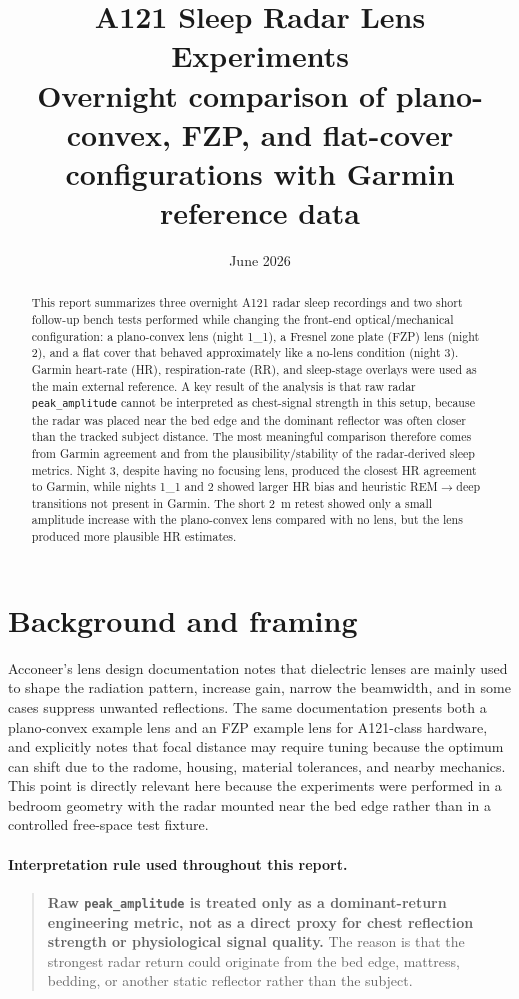 \documentclass[11pt,a4paper]{article}
\title{A121 Sleep Radar Lens Experiments\\\large Overnight comparison of plano-convex, FZP, and flat-cover configurations with Garmin reference data}
\author{}
\date{June 2026}
\begin{document}
\maketitle

\begin{abstract}
This report summarizes three overnight A121 radar sleep recordings and two short follow-up bench tests performed while changing the front-end optical/mechanical configuration: a plano-convex lens (night 1\_1), a Fresnel zone plate (FZP) lens (night 2), and a flat cover that behaved approximately like a no-lens condition (night 3). Garmin heart-rate (HR), respiration-rate (RR), and sleep-stage overlays were used as the main external reference. A key result of the analysis is that raw radar \texttt{peak\_amplitude} cannot be interpreted as chest-signal strength in this setup, because the radar was placed near the bed edge and the dominant reflector was often closer than the tracked subject distance. The most meaningful comparison therefore comes from Garmin agreement and from the plausibility/stability of the radar-derived sleep metrics. Night 3, despite having no focusing lens, produced the closest HR agreement to Garmin, while nights 1\_1 and 2 showed larger HR bias and heuristic REM$\rightarrow$deep transitions not present in Garmin. The short \SI{2}{m} retest showed only a small amplitude increase with the plano-convex lens compared with no lens, but the lens produced more plausible HR estimates.
\end{abstract}

\section{Background and framing}
Acconeer's lens design documentation notes that dielectric lenses are mainly used to shape the radiation pattern, increase gain, narrow the beamwidth, and in some cases suppress unwanted reflections. The same documentation presents both a plano-convex example lens and an FZP example lens for A121-class hardware, and explicitly notes that focal distance may require tuning because the optimum can shift due to the radome, housing, material tolerances, and nearby mechanics. This point is directly relevant here because the experiments were performed in a bedroom geometry with the radar mounted near the bed edge rather than in a controlled free-space test fixture.

\paragraph{Interpretation rule used throughout this report.}
\begin{quote}
\textbf{Raw \texttt{peak\_amplitude} is treated only as a dominant-return engineering metric, not as a direct proxy for chest reflection strength or physiological signal quality.} The reason is that the strongest radar return could originate from the bed edge, mattress, bedding, or another static reflector rather than the subject.
\end{quote}
\end{document}
